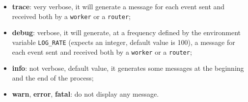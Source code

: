 \begin{itemize}
  \item \textbf{trace}: very verbose, it will generate a message for each event sent and received both by a \texttt{worker} or a \texttt{router};
  \item \textbf{debug}: verbose, it will generate, at a frequency defined by the environment variable \texttt{LOG\_RATE} (expects an integer, default value is 100), a message for each event sent and received both by a \texttt{worker} or a \texttt{router};
  \item \textbf{info}: not verbose, default value, it generates some messages at the beginning and the end of the process;
  \item \textbf{warn}, \textbf{error}, \textbf{fatal}: do not display any message.
\end{itemize}
